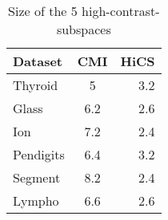\documentclass[12pt,a4paper]{scrartcl}
\begin{document}
  
\begin{table}
\begin{center} 
  \begin{tabular}{lcr}
 \hline
  Dataset & CMI & HiCS \\
  \hline
  Thyroid & 5 & 3.2 \\
  Glass & 6.2 & 2.6  \\
  Ion & 7.2 & 2.4 \\
  Pendigits & 6.4 & 3.2 \\
  Segment & 8.2 & 2.4\\
  Lympho & 6.6 & 2.6  \\
  \hline
 \end{tabular} 
  \caption { Size of the 5 high-contrast-subspaces}
  \end{center}
\end{table} 
 

 
\end{document}
